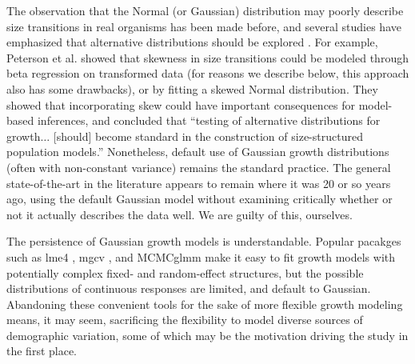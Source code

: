\documentclass[12pt]{article}
\begin{document}
\begin{spacing}{1.9}
The observation that the Normal (or Gaussian) distribution may poorly describe size transitions in real organisms has been made before,  
and several studies have emphasized that alternative distributions should be explored \citep{easterling2000size,peterson2019improving,rees2014building,williams2012avoiding}. 
For example, Peterson et al. \citeyear{peterson2019improving} showed that skewness in size transitions could be modeled through beta regression on transformed data (for reasons we describe below, this approach also has some drawbacks),
or by fitting a skewed Normal distribution. 
They showed that incorporating skew could have important consequences for model-based inferences, and concluded that ``testing of alternative distributions for growth$\ldots$ [should] become standard in the construction of size-structured population models.''
Nonetheless, default use of Gaussian growth distributions (often with non-constant variance) remains the standard practice. 
The general state-of-the-art in the literature appears to remain where it was 20 or so years ago, using the default Gaussian model without examining critically whether or not it actually describes the data well.  
We are guilty of this, ourselves. 

The persistence of Gaussian growth models is understandable. 
Popular pacakges such as lme4 \citep{bates2007lme4}, mgcv \citep{wood-2017}, and MCMCglmm \citep{hadfield2010mcmc} make it easy to fit growth models with potentially complex fixed- and random-effect structures, but the possible distributions of continuous responses are limited, and default to Gaussian. 
Abandoning these convenient tools for the sake of more flexible growth modeling means, it may seem, sacrificing the flexibility to model diverse sources of demographic variation, some of which may be the motivation driving the study in the first place.


\end{spacing}
\end{document}
